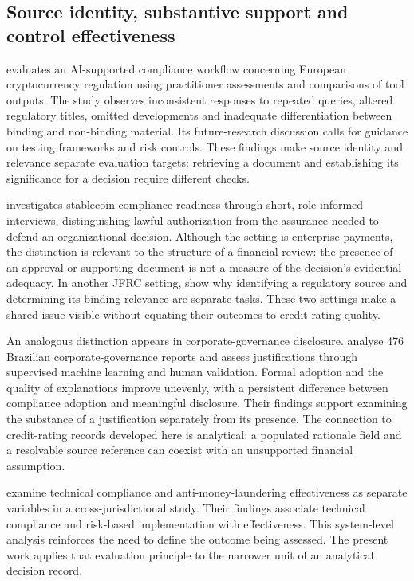 \documentclass[11pt,a4paper]{article}
\begin{document}
\subsection{Source identity, substantive support and control effectiveness}

\citet{prorokowski2026} evaluates an AI-supported compliance workflow concerning European cryptocurrency regulation using practitioner assessments and comparisons of tool outputs. The study observes inconsistent responses to repeated queries, altered regulatory titles, omitted developments and inadequate differentiation between binding and non-binding material. Its future-research discussion calls for guidance on testing frameworks and risk controls. These findings make source identity and relevance separate evaluation targets: retrieving a document and establishing its significance for a decision require different checks.

\citet{aria2026} investigates stablecoin compliance readiness through short, role-informed interviews, distinguishing lawful authorization from the assurance needed to defend an organizational decision. Although the setting is enterprise payments, the distinction is relevant to the structure of a financial review: the presence of an approval or supporting document is not a measure of the decision's evidential adequacy. In another JFRC setting, \citet{prorokowski2026} show why identifying a regulatory source and determining its binding relevance are separate tasks. These two settings make a shared issue visible without equating their outcomes to credit-rating quality.

An analogous distinction appears in corporate-governance disclosure. \citet{roncato2026} analyse 476 Brazilian corporate-governance reports and assess justifications through supervised machine learning and human validation. Formal adoption and the quality of explanations improve unevenly, with a persistent difference between compliance adoption and meaningful disclosure. Their findings support examining the substance of a justification separately from its presence. The connection to credit-rating records developed here is analytical: a populated rationale field and a resolvable source reference can coexist with an unsupported financial assumption.

\citet{sitab2026} examine technical compliance and anti-money-laundering effectiveness as separate variables in a cross-jurisdictional study. Their findings associate technical compliance and risk-based implementation with effectiveness. This system-level analysis reinforces the need to define the outcome being assessed. The present work applies that evaluation principle to the narrower unit of an analytical decision record.
\end{document}
